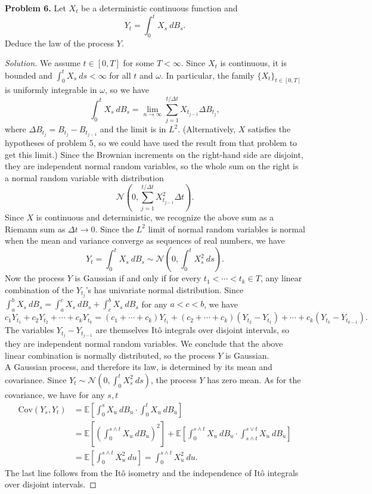 \documentclass[11pt,letterpaper]{report}
\newcommand{\mcal}[1]{\mathcal{#1}}
\newcommand{\E}{\mathbb{E}}
\newcommand{\Cov}{\text{Cov}}
\newenvironment{solution}
{\begin{proof}[Solution]}
{\end{proof}}
\begin{document}
\noindent\textbf{Problem 6. }
Let $X_t$ be a deterministic continuous function and 
\[
Y_t = \int_0^tX_s\ dB_s.
\]
Deduce the law of the process $Y$.
\begin{solution}
	We assume $t\in [0, T]$ for some $T<\infty$. Since $X_t$ is continuous, it is bounded and $\int_0^tX_s\ ds<\infty$ for all $t$ and $\omega$. In particular, the family $\{X_t\}_{t\in [0, T]}$ is uniformly integrable in $\omega$, so we have
	\[
	\int_0^tX_s\ dB_s = \lim_{n\to \infty}\sum_{j=1}^{t/\Delta t}X_{t_{j-1}}\Delta B_{t_j},
	\]
	where $\Delta B_{t_j} = B_{t_j} - B_{t_{j-1}}$ and the limit is in $L^2$. (Alternatively, $X$ satisfies the hypotheses of problem 5, so we could have used the result from that problem to get this limit.) Since the Brownian increments on the right-hand side are disjoint, they are independent normal random variables, so the whole sum on the right is a normal random variable with distribution
	\[
	\mcal{N}\left(0, \sum_{j=1}^{t/\Delta t}X_{t_{j-1}}^2\Delta t\right).
	\]
	Since $X$ is continuous and deterministic, we recognize the above sum as a Riemann sum as $\Delta t\to 0$. Since the $L^2$ limit of normal random variables is normal when the mean and variance converge as sequences of real numbers, we have
	\[
	Y_t = \int_0^tX_s\ dB_s \sim \mcal{N}\left(0, \int_0^tX_s^2\ ds\right).
	\]
	Now the process $Y$ is Gaussian if and only if for every $t_1<\cdots<t_k \in T$, any linear combination of the $Y_{t_j}$'s has univariate normal distribution. Since $\int_a^b X_s\ dB_s = \int_a^c X_s\ dB_s + \int_c^bX_s\ dB_s$ for any $a<c<b$, we have
	\[
	c_1Y_{t_1} + c_2Y_{t_2} + \cdots + c_kY_{t_k} = (c_1 + \cdots + c_k)Y_{t_1} + (c_2 + \cdots + c_k)(Y_{t_2}-Y_{t_1}) + \cdots + c_k(Y_{t_k}-Y_{t_{k-1}}).
	\]
	The variables $Y_{t_j} - Y_{t_{j-1}}$ are themselves It\^o integrals over disjoint intervals, so they are independent normal random variables. We conclude that the above linear combination is normally distributed, so the process $Y$ is Gaussian.\\

	\noindent A Gaussian process, and therefore its law, is determined by its mean and covariance. Since $Y_t \sim \mcal{N}(0, \int_0^t X_s^2\ ds)$, the process $Y$ has zero mean. As for the covariance, we have for any $s,t$
	\begin{align*}
		\Cov(Y_s, Y_t) &= \E\left[\int_0^sX_u\ dB_u\cdot \int_0^tX_u\ dB_u \right]\\
		&= \E\left[\left(\int_0^{s\land t}X_u\ dB_u\right)^2\right] + \E\left[\int_0^{s\land t}X_u\ dB_u\cdot \int_{s\land t}^{s\lor t}X_u\ dB_u\right]\\
		&= \E\left[\int_0^{s\land t}X_u^2\ du\right] = \int_0^{s\land t}X_u^2\ du.
	\end{align*}
	The last line follows from the It\^o isometry and the independence of It\^o integrals over disjoint intervals.
\end{solution}
\end{document}
